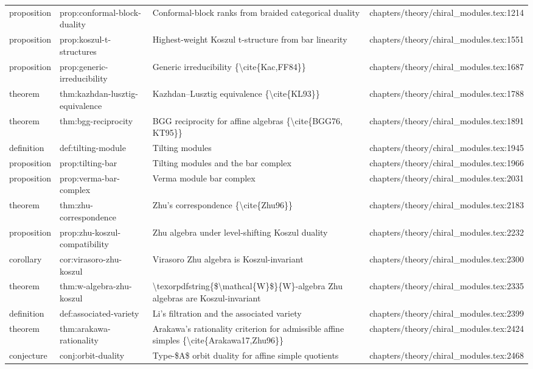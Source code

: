\documentclass[11pt]{article}
\begin{document}
\begin{longtable}{L{0.10\textwidth}L{0.26\textwidth}L{0.42\textwidth}L{0.22\textwidth}}
proposition & prop:conformal-block-duality & Conformal-block ranks from braided categorical duality & chapters/theory/chiral\_modules.tex:1214\\
proposition & prop:koszul-t-structures & Highest-weight Koszul t-structure from bar linearity & chapters/theory/chiral\_modules.tex:1551\\
proposition & prop:generic-irreducibility & Generic irreducibility \{\textbackslash{}cite\{Kac,FF84\}\} & chapters/theory/chiral\_modules.tex:1687\\
theorem & thm:kazhdan-lusztig-equivalence & Kazhdan--Lusztig equivalence \{\textbackslash{}cite\{KL93\}\} & chapters/theory/chiral\_modules.tex:1788\\
theorem & thm:bgg-reciprocity & BGG reciprocity for affine algebras \{\textbackslash{}cite\{BGG76, KT95\}\} & chapters/theory/chiral\_modules.tex:1891\\
definition & def:tilting-module & Tilting modules & chapters/theory/chiral\_modules.tex:1945\\
proposition & prop:tilting-bar & Tilting modules and the bar complex & chapters/theory/chiral\_modules.tex:1966\\
proposition & prop:verma-bar-complex & Verma module bar complex & chapters/theory/chiral\_modules.tex:2031\\
theorem & thm:zhu-correspondence & Zhu's correspondence \{\textbackslash{}cite\{Zhu96\}\} & chapters/theory/chiral\_modules.tex:2183\\
proposition & prop:zhu-koszul-compatibility & Zhu algebra under level-shifting Koszul duality & chapters/theory/chiral\_modules.tex:2232\\
corollary & cor:virasoro-zhu-koszul & Virasoro Zhu algebra is Koszul-invariant & chapters/theory/chiral\_modules.tex:2300\\
theorem & thm:w-algebra-zhu-koszul & \textbackslash{}texorpdfstring\{\$\textbackslash{}mathcal\{W\}\$\}\{W\}-algebra Zhu algebras are Koszul-invariant & chapters/theory/chiral\_modules.tex:2335\\
definition & def:associated-variety & Li's filtration and the associated variety & chapters/theory/chiral\_modules.tex:2399\\
theorem & thm:arakawa-rationality & Arakawa's rationality criterion for admissible affine simples \{\textbackslash{}cite\{Arakawa17,Zhu96\}\} & chapters/theory/chiral\_modules.tex:2424\\
conjecture & conj:orbit-duality & Type-\$A\$ orbit duality for affine simple quotients & chapters/theory/chiral\_modules.tex:2468\\

\end{longtable}
\end{document}
